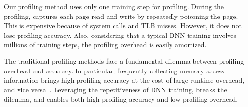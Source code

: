 

Our profiling method uses only one %
training step for profiling. During the profiling, \name captures each page read and write by repeatedly poisoning the page. This is expensive because of system calls and TLB misses. However, it does not lose profiling accuracy. Also, considering that a typical DNN training involves millions of training steps, the profiling overhead is easily amortized.  

The traditional profiling methods face a fundamental dilemma between profiling overhead and accuracy. In particular, frequently collecting memory access information brings high profiling accuracy at the cost of large runtime overhead, and vice versa~\cite{Thermostat:asplos17,RAMinate:socc16,heteros:isca17, sc18:wu, unimem:sc17}. Leveraging the repetitiveness of DNN training, \name breaks the dilemma, and enables both high profiling accuracy and low profiling overhead. 



